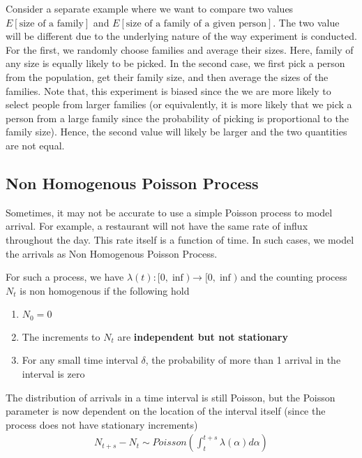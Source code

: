 \documentclass[../probability-notes.tex]{subfiles}
\begin{document}
    Consider a separate example where we want to compare two values $E[\text{size of a family}]$ and $E[\text{size of a family of a given person}]$.\newline
    The two value will be different due to the underlying nature of the way experiment is conducted. For the first, we randomly choose families and average their sizes. Here, family of any size is equally likely to be picked. In the second case, we first pick a person from the population, get their family size, and then average the sizes of the families. Note that, this experiment is biased since the we are more likely to select people from larger families (or equivalently, it is more likely that we pick a person from a large family since the probability of picking is proportional to the family size). Hence, the second value will likely be larger and the two quantities are not equal.


    \subsection{Non Homogenous Poisson Process}
    Sometimes, it may not be accurate to use a simple Poisson process to model arrival. For example, a restaurant will not have the same rate of influx throughout the day. This rate itself is a function of time. In such cases, we model the arrivals as Non Homogenous Poisson Process.\newline

    For such a process, we have $\lambda(t): [0,\inf) \to [0, \inf)$ and the counting process $N_{t}$ is non homogenous if the following hold
    \begin{enumerate}
        \item $N_{0} = 0$
        \item The increments to $N_{t}$ are \textbf{independent but not stationary}
        \item For any small time interval $\delta$, the probability of more than 1 arrival in the interval is zero
    \end{enumerate}

    The distribution of arrivals in a time interval is still Poisson, but the Poisson parameter is now dependent on the location of the interval itself (since the process does not have stationary increments)
    \begin{align*}
        N_{t+s} - N_{t} \sim Poisson(\int_{t}^{t+s} \lambda(\alpha) d\alpha)
    \end{align*}
\end{document}
